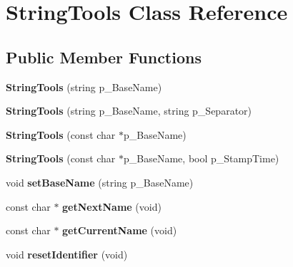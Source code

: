 \hypertarget{classStringTools}{\section{String\-Tools Class Reference}
\label{classStringTools}
}
\subsection*{Public Member Functions}
\begin{DoxyCompactItemize}
\item 
\hypertarget{classStringTools_ad0ce8a471ba7eb6e48a8609ab924d1d5}{{\bfseries String\-Tools} (string p\-\_\-\-Base\-Name)}\label{classStringTools_ad0ce8a471ba7eb6e48a8609ab924d1d5}

\item 
\hypertarget{classStringTools_a3ff5ab3693687b6359003b7246a02283}{{\bfseries String\-Tools} (string p\-\_\-\-Base\-Name, string p\-\_\-\-Separator)}\label{classStringTools_a3ff5ab3693687b6359003b7246a02283}

\item 
\hypertarget{classStringTools_aa42f8614db6be692ea5186874b66009c}{{\bfseries String\-Tools} (const char $\ast$p\-\_\-\-Base\-Name)}\label{classStringTools_aa42f8614db6be692ea5186874b66009c}

\item 
\hypertarget{classStringTools_a9b9003e1e4a696edd5c4cb1c84e6d11c}{{\bfseries String\-Tools} (const char $\ast$p\-\_\-\-Base\-Name, bool p\-\_\-\-Stamp\-Time)}\label{classStringTools_a9b9003e1e4a696edd5c4cb1c84e6d11c}

\item 
\hypertarget{classStringTools_a0ce4f82e772571fc12577eb9f1691e06}{void {\bfseries set\-Base\-Name} (string p\-\_\-\-Base\-Name)}\label{classStringTools_a0ce4f82e772571fc12577eb9f1691e06}

\item 
\hypertarget{classStringTools_a272d76e82bdfe029acbf0bd65744025d}{const char $\ast$ {\bfseries get\-Next\-Name} (void)}\label{classStringTools_a272d76e82bdfe029acbf0bd65744025d}

\item 
\hypertarget{classStringTools_a0d352e612af5b42b3324de44baaeeec9}{const char $\ast$ {\bfseries get\-Current\-Name} (void)}\label{classStringTools_a0d352e612af5b42b3324de44baaeeec9}

\item 
\hypertarget{classStringTools_a498868ff22278d1be842ad92be7b3e52}{void {\bfseries reset\-Identifier} (void)}\label{classStringTools_a498868ff22278d1be842ad92be7b3e52}


\end{DoxyCompactItemize}
